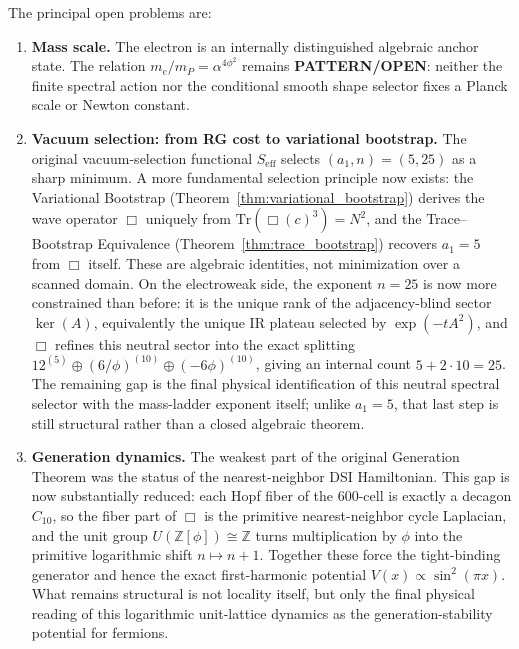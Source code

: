 \documentclass[12pt,a4paper]{article}
\theoremstyle{definition}
\begin{document}
The principal open problems are:
\begin{enumerate}
\item \textbf{Mass scale.}  The electron is an internally distinguished algebraic anchor state.  The relation $m_e/m_P=\alpha^{4\phi^2}$ remains \textbf{PATTERN/OPEN}: neither the finite spectral action nor the conditional smooth shape selector fixes a Planck scale or Newton constant.
\item \textbf{Vacuum selection: from RG cost to variational bootstrap.}  The original vacuum-selection functional $S_{\mathrm{eff}}$ selects $(a_1,n) = (5,25)$ as a sharp minimum.  A more fundamental selection principle now exists: the Variational Bootstrap (Theorem~\ref{thm:variational_bootstrap}) derives the wave operator $\Box$ uniquely from $\mathrm{Tr}(\Box(c)^3) = N^2$, and the Trace--Bootstrap Equivalence (Theorem~\ref{thm:trace_bootstrap}) recovers $a_1 = 5$ from $\Box$ itself.  These are algebraic identities, not minimization over a scanned domain.  On the electroweak side, the exponent $n = 25$ is now more constrained than before: it is the unique rank of the adjacency-blind sector $\ker(A)$, equivalently the unique IR plateau selected by $\exp(-tA^2)$, and $\Box$ refines this neutral sector into the exact splitting $12^{(5)} \oplus (6/\phi)^{(10)} \oplus (-6\phi)^{(10)}$, giving an internal count $5 + 2\cdot10 = 25$.  The remaining gap is the final physical identification of this neutral spectral selector with the mass-ladder exponent itself; unlike $a_1 = 5$, that last step is still structural rather than a closed algebraic theorem.
\item \textbf{Generation dynamics.}  The weakest part of the original Generation Theorem was the status of the nearest-neighbor DSI Hamiltonian.  This gap is now substantially reduced: each Hopf fiber of the 600-cell is exactly a decagon $C_{10}$, so the fiber part of $\Box$ is the primitive nearest-neighbor cycle Laplacian, and the unit group $U(\mathbb{Z}[\phi]) \cong \mathbb{Z}$ turns multiplication by $\phi$ into the primitive logarithmic shift $n \mapsto n+1$.  Together these force the tight-binding generator and hence the exact first-harmonic potential $V(x) \propto \sin^2(\pi x)$.  What remains structural is not locality itself, but only the final physical reading of this logarithmic unit-lattice dynamics as the generation-stability potential for fermions.

\end{enumerate}
\end{document}
